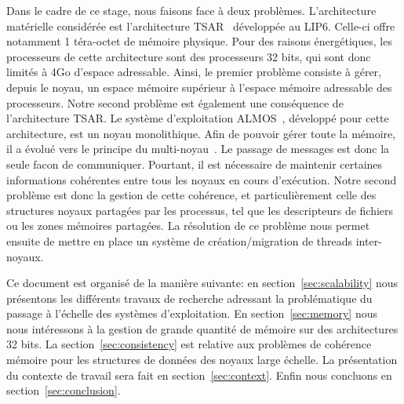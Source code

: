   \hspace{1cm}Dans le cadre de ce stage, nous faisons face à deux
  problèmes. L'architecture matérielle considérée est l'architecture
  TSAR~\citep{greiner2009tsar} développée au LIP6. Celle-ci offre notamment 1
  téra-octet de mémoire physique. Pour des raisons énergétiques, les processeurs
  de cette architecture sont des processeurs 32 bits, qui sont donc limités à
  4Go d'espace adressable. Ainsi, le premier problème consiste à gérer, depuis
  le noyau, un espace mémoire supérieur à l'espace mémoire adressable des
  processeurs. Notre second problème est également une conséquence de
  l'architecture TSAR. Le système d'exploitation
  ALMOS~\citep{almaless2011almos}, développé pour cette architecture, est un
  noyau monolithique. Afin de pouvoir gérer toute la mémoire, il a évolué vers
  le principe du multi-noyau~\cite{schupbach2008embracing}. Le passage de
  messages est donc la seule facon de communiquer. Pourtant, il est nécessaire
  de maintenir certaines informations cohérentes entre tous les noyaux en cours
  d'exécution. Notre second problème est donc la gestion de cette cohérence, et
  particulièrement celle des structures noyaux partagées par les processus, tel
  que les descripteurs de fichiers ou les zones mémoires partagées. La
  résolution de ce problème nous permet ensuite de mettre en place un système de
  création/migration de threads inter-noyaux.\newline

  \hspace{1cm}Ce document est organisé de la manière suivante: en
  section~\ref{sec:scalability} nous présentons les différents travaux de
  recherche adressant la problématique du passage à l'échelle des systèmes
  d'exploitation. En section~\ref{sec:memory} nous nous intéressons à la gestion
  de grande quantité de mémoire sur des architectures 32 bits. La
  section~\ref{sec:consistency} est relative aux problèmes de cohérence mémoire
  pour les structures de données des noyaux large échelle. La présentation du
  contexte de travail sera fait en section~\ref{sec:context}. Enfin nous
  concluons en section~\ref{sec:conclusion}.

